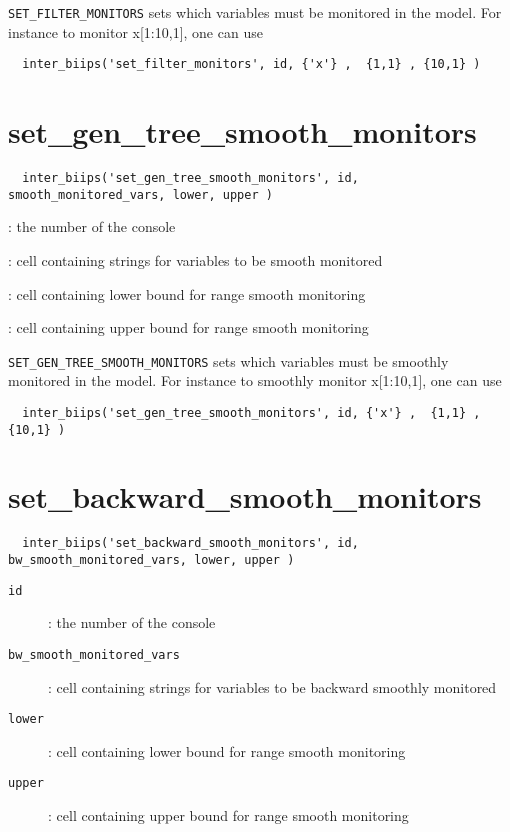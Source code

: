 \documentclass[11pt]{article}
\begin{document}
   \texttt{SET\_FILTER\_MONITORS} sets which variables must be monitored in the model. For instance to monitor x[1:10,1], one can use
 \begin{lstlisting}
  inter_biips('set_filter_monitors', id, {'x'} ,  {1,1} , {10,1} )
 \end{lstlisting}

\section{set\_gen\_tree\_smooth\_monitors}

 \begin{lstlisting}
  inter_biips('set_gen_tree_smooth_monitors', id, smooth_monitored_vars, lower, upper )
 \end{lstlisting}

   \begin{description}
   \setlength{\baselineskip}{0.1\baselineskip}
     \item[\texttt{id}]: the number of the console
     \item[\texttt{smooth\_monitored\_vars}]: cell containing strings for variables to be smooth monitored
     \item[\texttt{lower}]: cell containing lower bound for range smooth monitoring
     \item[\texttt{upper}]: cell containing upper bound for range smooth monitoring 
   
   \end{description}

   \texttt{SET\_GEN\_TREE\_SMOOTH\_MONITORS} sets which variables must be smoothly monitored in the model. For instance to smoothly monitor x[1:10,1], one can use
 \begin{lstlisting}
  inter_biips('set_gen_tree_smooth_monitors', id, {'x'} ,  {1,1} , {10,1} )
 \end{lstlisting}


\section{set\_backward\_smooth\_monitors}

 \begin{lstlisting}
  inter_biips('set_backward_smooth_monitors', id, bw_smooth_monitored_vars, lower, upper )
 \end{lstlisting}

   \begin{description}
     \item[\texttt{id}]: the number of the console
     \item[\texttt{bw\_smooth\_monitored\_vars}]: cell containing strings for variables to be backward smoothly monitored
     \item[\texttt{lower}]: cell containing lower bound for range smooth monitoring
     \item[\texttt{upper}]: cell containing upper bound for range smooth monitoring 
   
   \end{description}
\end{document}
